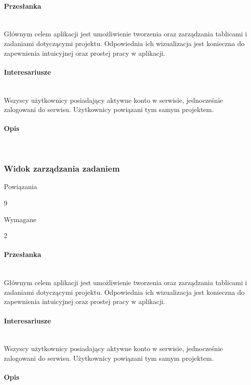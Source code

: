 \documentclass[eng,printmode]{mgr}
\begin{document}
\paragraph{Przesłanka}\ \\
Głównym celem aplikacji jest umożliwienie tworzenia oraz zarządzania tablicami i zadaniami dotyczącymi projektu. Odpowiednia ich wizualizacja jest konieczna do zapewnienia intuicyjnej oraz prostej pracy w aplikacji.

\paragraph{Interesariusze}\ \\
Wszyscy użytkownicy posiadający aktywne konto w serwisie, jednocześnie zalogowani do serwisu. Użytkownicy powiązani tym samym projektem.

\paragraph{Opis}\ \\
\newpage

\subsubsection{Widok zarządzania zadaniem}
\begin{labeling}{Powiązania}
\item [ID:] 9
\item [Typ:] Wymagane
\item [Powiązania] 2
\end{labeling}
\paragraph{Przesłanka}\ \\
Głównym celem aplikacji jest umożliwienie tworzenia oraz zarządzania tablicami i zadaniami dotyczącymi projektu. Odpowiednia ich wizualizacja jest konieczna do zapewnienia intuicyjnej oraz prostej pracy w aplikacji.

\paragraph{Interesariusze}\ \\
Wszyscy użytkownicy posiadający aktywne konto w serwisie, jednocześnie zalogowani do serwisu. Użytkownicy powiązani tym samym projektem.

\paragraph{Opis}\ \\
\newpage
\end{document}
